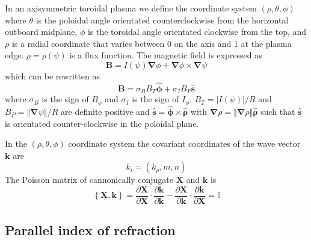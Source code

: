 \documentclass[a4paper,12pt]{article}%
\begin{document}
In an axisymmetric toroidal plasma we define the coordinate system $\left(
\rho,\theta,\phi\right)  $ where $\theta$ is the poloidal angle orientated
counterclockwise from the horizontal outboard midplane, $\phi$ is the toroidal
angle orientated clockwise from the top, and $\rho$ is a radial coordinate
that varies between $0$ on the axis and $1$ at the plasma edge. $\rho
=\rho\left(  \psi\right)  $ is a flux function. The magnetic field is
expressed as%
\begin{equation}
\mathbf{B}=I\left(  \psi\right)  \mathbf{\nabla}\phi+\mathbf{\nabla}\phi
\times\mathbf{\nabla}\psi
\end{equation}
which can be rewritten as%
\begin{equation}
\mathbf{B}=\sigma_{B}B_{T}\widehat{\mathbf{\phi}}+\sigma_{I}B_{P}%
\widehat{\mathbf{s}}%
\end{equation}
where $\sigma_{B}$ is the sign of $B_{\phi}$ and $\sigma_{I}$ is the sign of
$I_{\phi}$. $B_{T}=\left\vert I\left(  \psi\right)  \right\vert /R$ and
$B_{P}=\left\Vert \mathbf{\nabla}\psi\right\Vert /R$ are definite positive and
$\widehat{\mathbf{s}}=\widehat{\mathbf{\phi}}\times\widehat{\mathbf{\rho}}$
with $\mathbf{\nabla}\rho=\left\Vert \mathbf{\nabla}\rho\right\Vert
\widehat{\mathbf{\rho}}$ such that $\widehat{\mathbf{s}}$ is orientated
counter-clockwise in the poloidal plane.

In the $\left(  \rho,\theta,\phi\right)  $ coordinate system the covariant
coordinates of the wave vector $\mathbf{k}$ are%
\begin{equation}
k_{i}=\left(  k_{\rho},m,n\right)
\end{equation}
The Poisson matrix of cannonically conjugate $\mathbf{X}$ and $\mathbf{k}$ is
\begin{equation}
\left\{  \mathbf{X},\mathbf{k}\right\}  =\dfrac{\partial\mathbf{X}}%
{\partial\mathbf{X}}\cdot\dfrac{\partial\mathbf{k}}{\partial\mathbf{k}}%
-\dfrac{\partial\mathbf{X}}{\partial\mathbf{k}}\cdot\dfrac{\partial\mathbf{k}%
}{\partial\mathbf{X}}=\mathbb{I}%
\end{equation}


\subsection{Parallel index of refraction}
\end{document}
